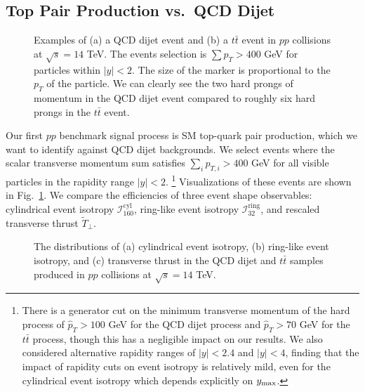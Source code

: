 \documentclass[letterpaper,11pt]{article}
\newcommand{\iso}[2]{\mathcal{I}^\text{#1}_{#2}}
\DeclareRobustCommand{\Fig}[1]{Fig.~\ref{#1}}
\begin{document}
\subsection{Top Pair Production vs.\ QCD Dijet}
\label{subsec:toppair_pp}
\begin{figure}[t!]
%
\centering
{}
     \hfill
     \hfill
\caption{Examples of (a) a QCD dijet event and (b) a $t\bar{t}$ event in $pp$ collisions at $\sqrt{s} =14$ TeV. 
%
The events selection is $\sum p_T > 400$ GeV for particles within $|y| < 2$. 
%
The size of the marker is proportional to the $p_T$ of the particle.
%
We can clearly see the two hard prongs of momentum in the QCD dijet event compared to roughly six hard prongs in the $t\bar{t}$ event.
}
%
\label{fig:ppVis}
\end{figure}

Our first $pp$ benchmark signal process is SM top-quark pair production, which we want to identify against QCD dijet backgrounds.
%
We select events where the scalar transverse momentum sum satisfies $\sum_i p_{T,i} > 400$ GeV for all visible particles in the rapidity range $|y| < 2$.%
%
\footnote{There is a generator cut on the minimum transverse momentum of the hard process of $\hat{p}_T >100$ GeV for the QCD dijet process and $\hat{p}_T > 70$ GeV for the $t\bar{t}$ process, though this has a negligible impact on our results.
%
We also considered alternative rapidity ranges of $|y|<2.4$ and $|y| < 4$, finding that the impact of rapidity cuts on event isotropy is relatively mild, even for the cylindrical event isotropy which depends explicitly on $y_{\rm max}$.} 
%
Visualizations of these events are shown in \Fig{fig:ppVis}.
%
We compare the efficiencies of three event shape observables: cylindrical event isotropy $\iso{cyl}{160}$, ring-like event isotropy $\iso{ring}{32}$, and rescaled transverse thrust $\widetilde{T}_{\perp}$. 


\begin{figure}[t!]
%
\centering
{}
     \hfill
     \hfill
\caption{The distributions of (a) cylindrical event isotropy, (b) ring-like event isotropy, and (c) transverse thrust in the QCD dijet and $t\bar{t}$ samples produced in $pp$ collisions at $\sqrt{s} = 14$ TeV.}
%
\label{fig:ppSpec}
\end{figure}
\end{document}

